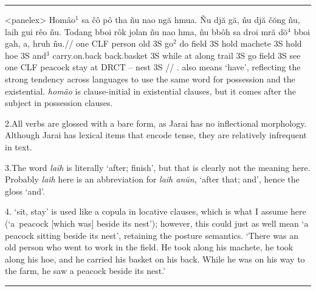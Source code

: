 \documentclass[12pt]{article}
\begin{document}
\hrule\medskip

\begingroup
\ex<panelex>
\def\\#1{{\footnotesize\uppercase{#1}}}%
\beginglpanel[ssratio=.5,glhangstyle=none]
\gla Hom\^{a}o$^1$ sa \v{c}\^{o} p\^{o} tha  \~{n}u nao ng\u{a}
hmua. \~{N}u dj\u{a} g\u{a}, \~{n}u dj\u{a} \v{c}\u{o}ng \~{n}u,
laih gui r\^{e}o \~{n}u. Todang bboi r\^{o}k jolan \~{n}u nao
hma, \~{n}u bb\^{o}h sa droi mr\u{a} d\u{o}$^4$ bboi gah, a, hruh
\~{n}u.//
\glb \\{exist} one \\{clf} person old \\{3s} go$^2$ do field
\\{3s} hold machete \\{3s} hold hoe \\{3s} and$^3$ carry.on.back
back.basket \\{3s} while at along trail \\{3s} go field \\{3s}
see one \\{clf} peacock stay at \\{drct} -- nest \\{3s}
//
. also means `have', reflecting the
strong tendency across languages to use the same word for
possession and the existential. {\it hom\^{a}o} is clause-initial
in existential clauses, but it comes after the subject in
possession clauses.

2.\enspace All verbs are glossed with a bare form, as Jarai has
no inflectional morphology. Although Jarai has lexical items that
encode tense, they are relatively infrequent in text.

3.\enspace The word {\it laih} is literally `after; finish', but
that is clearly not the meaning here. Probably {\it laih} here is
an abbreviation for {\it laih an\u{u}n}, `after that; and', hence
the gloss `and'.

4. `sit, stay' is used like a copula in
locative clauses, which is what I assume here (`a~peacock
[which was] beside its nest'); however, this could just as well
mean `a peacock sitting beside its nest', retaining the posture
semantics.
\endpanel
\bigskip
`There was an old person who went to work in the field. He took
along his machete, he took along his hoe, and he carried his
basket on his back. While he was on his way to the farm, he saw a
peacock beside its nest.'
\xe
\endgroup
\bigskip

\hrule\medskip
\end{document}
